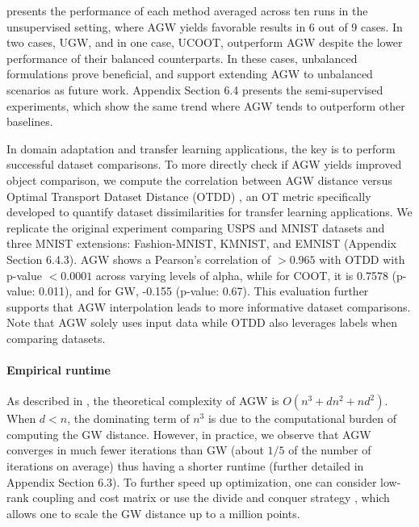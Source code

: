  presents the performance of each method averaged across ten runs in
the unsupervised setting, where AGW yields favorable results in 6 out of 9 cases. In two cases,
UGW, and in one case, UCOOT, outperform AGW despite the lower performance of
their balanced counterparts. In these cases, unbalanced formulations prove beneficial,
and support extending AGW to unbalanced scenarios as future work.
Appendix Section 6.4 presents the semi-supervised experiments,
which show the same trend where AGW tends to outperform other baselines.

In domain adaptation and transfer learning applications, the key is to perform
successful dataset comparisons. To more directly check if AGW yields improved object comparison,
we compute the correlation between AGW distance versus Optimal Transport Dataset Distance (OTDD)
\citep{Melis20}, an OT metric specifically developed to quantify dataset dissimilarities
for transfer learning applications. We replicate the original experiment comparing
USPS and MNIST datasets and three MNIST extensions: Fashion-MNIST, KMNIST, and EMNIST
(Appendix Section 6.4.3). AGW shows a Pearson's correlation of $>0.965$
with OTDD with p-value $<0.0001$ across varying levels of alpha, while for COOT, it is 0.7578
(p-value: 0.011), and for GW, -0.155 (p-value: 0.67).
This evaluation further supports that AGW interpolation leads to more informative dataset comparisons.
Note that AGW solely uses input data while OTDD also leverages labels when comparing datasets.

\paragraph{Empirical runtime} As described in ,
the theoretical complexity of AGW is $O(n^3 + dn^2 + nd^2)$. When $d<n$,
the dominating term of $n^3$ is due to the computational burden of computing the GW distance.
However, in practice, we observe that AGW converges in much fewer iterations than GW
(about $1/5$ of the number of iterations on average) thus having a shorter runtime
(further detailed in Appendix Section 6.3). To further speed up optimization,
one can consider low-rank coupling and cost matrix \citep{Meyer21b} or
use the divide and conquer strategy \citep{Chowdhury21a},
which allows one to scale the GW distance up to a million points.


